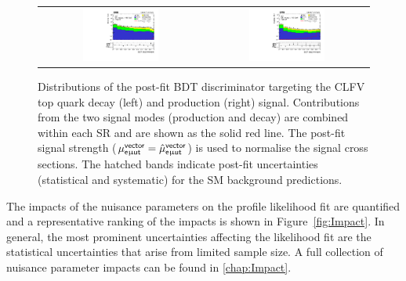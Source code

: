 \begin{figure}[tbh!]
 \begin{center}
 \begin{tabular}{cc}
 \includegraphics[width=0.48\textwidth]{figures/Part3/Results/BDT_TT_VecU}&
 \includegraphics[width=0.48\textwidth]{figures/Part3/Results/BDT_ST_VecU}\\
 \end{tabular}
 \caption{Distributions of the post-fit \ac{BDT} discriminator targeting the \ac{CLFV} top quark decay (left) and production (right) signal. Contributions from the two signal modes (production and decay) are combined within each \ac{SR} and are shown as the solid red line. The post-fit signal strength ($\mu_{\emut{u}}^{\textsf{vector}}=\hat{\mu}_{\emut{u}}^{\textsf{vector}}$) is used to normalise the signal cross sections. The hatched bands indicate post-fit uncertainties (statistical and systematic) for the SM background predictions.}
 \label{fig:bdt_postfit_VecU}
 \end{center}
\end{figure} 

The impacts of the nuisance parameters on the profile likelihood fit are quantified and a representative ranking of the impacts is shown in Figure~\ref{fig:Impact}. In general, the most prominent uncertainties affecting the likelihood fit are the statistical uncertainties that arise from limited sample size. A full collection of nuisance parameter impacts can be found in \autoref{chap:Impact}.

